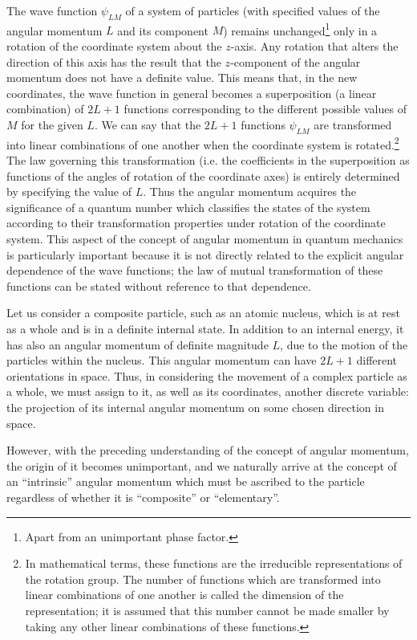 The wave function $\psi_{LM}$ of a system of particles (with specified values of the angular momentum $ L $ and its component $ M $) remains unchanged\footnote{Apart from an unimportant phase factor.
} only in a rotation of the coordinate system about the $ z $-axis. Any rotation that alters the direction of this axis has the result that the $ z $-component of the angular momentum does not have a definite value. This means that, in the new coordinates, the wave function in general becomes a superposition (a linear combination) of $ 2L + 1 $ functions corresponding to the different possible values of $ M $ for the given $ L $. We can say that the $ 2L + 1 $ functions $\psi_{LM}$ are transformed into linear combinations of one another when the coordinate system is rotated.\footnote{In mathematical terms, these functions are the irreducible representations of the rotation group. The number of functions which are transformed into linear combinations of one another is called the dimension of the representation; it is assumed that this number cannot be made smaller by taking any other linear combinations of these functions.
} The law governing this transformation (i.e. the coefficients in the superposition as functions of the angles of rotation of the coordinate axes) is entirely determined by specifying the value of $ L $. Thus the angular momentum acquires the significance of a quantum number which classifies the states of the system according to their transformation properties under rotation of the coordinate system. This aspect of the concept of angular momentum in quantum mechanics is particularly important because it is not directly related to the explicit angular dependence of the wave functions; the law of mutual transformation of these functions can be stated without reference to that dependence.

Let us consider a composite particle, such as an atomic nucleus, which is at rest as a whole and is in a definite internal state. In addition to an internal energy, it has also an angular momentum of definite magnitude $ L $, due to the motion of the particles within the nucleus. This angular momentum can have $ 2L + 1 $ different orientations in space. Thus, in considering the movement of a complex particle as a whole, we must assign to it, as well as its coordinates, another discrete variable: the projection of its internal angular momentum on some chosen direction in space.

However, with the preceding understanding of the concept of angular momentum, the origin of it becomes unimportant, and we naturally arrive at the concept of an “intrinsic” angular momentum which must be ascribed to the particle regardless of whether it is “composite” or “elementary”.

